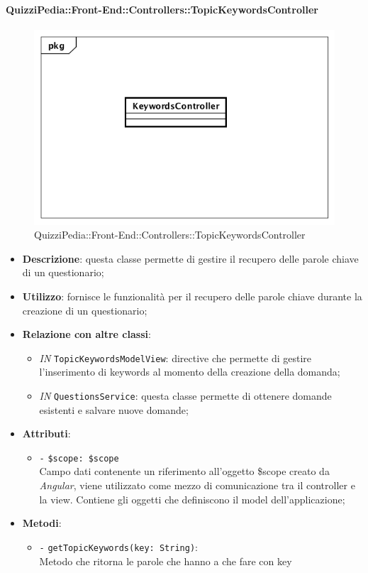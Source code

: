 \begin{itemize}
\paragraph{QuizziPedia::Front-End::Controllers::TopicKeywordsController}
\begin{figure} [ht]
	\centering
	\includegraphics[scale=0.45]{UML/Classi/Front-End/QuizziPedia_Front-end_Controller_TopicKeywordsController.png}
	\caption{QuizziPedia::Front-End::Controllers::TopicKeywordsController}
\end{figure} \FloatBarrier
\begin{itemize}
	\item \textbf{Descrizione}: questa classe permette di gestire il recupero delle parole chiave di un questionario;
	\item \textbf{Utilizzo}: fornisce le funzionalità per il recupero delle parole chiave durante la creazione di un questionario;
	\item \textbf{Relazione con altre classi}:
	\begin{itemize}
		\item \textit{IN} \texttt{TopicKeywordsModelView}: directive che permette di gestire l'inserimento di keywords al momento della creazione della domanda; 
		\item \textit{IN} \texttt{QuestionsService}: questa classe permette di ottenere domande esistenti e salvare nuove domande;
	\end{itemize}
	\item \textbf{Attributi}:
	\begin{itemize}
		\item \texttt{-} \texttt{\$scope: \$scope} \\
		Campo dati contenente un riferimento all’oggetto \$scope creato da \textit{Angular}, viene utilizzato come mezzo di comunicazione tra il controller e la view. Contiene gli oggetti che definiscono il model dell’applicazione;
	\end{itemize}
	\item \textbf{Metodi}:
	\begin{itemize}
		\item \texttt{-} \texttt{getTopicKeywords(key: String)}: \\ Metodo che ritorna le parole che hanno a che fare con key
	\end{itemize}
\end{itemize}


\end{itemize}
